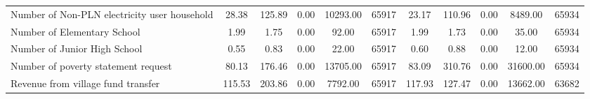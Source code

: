 \begin{tabular}{l*{2}{ccccc}}
Number of Non-PLN electricity user household&    28.38&   125.89&     0.00& 10293.00&    65917&    23.17&   110.96&     0.00&  8489.00&    65934\\
Number of Elementary School&     1.99&     1.75&     0.00&    92.00&    65917&     1.99&     1.73&     0.00&    35.00&    65934\\
Number of Junior High School&     0.55&     0.83&     0.00&    22.00&    65917&     0.60&     0.88&     0.00&    12.00&    65934\\
Number of poverty statement request&    80.13&   176.46&     0.00& 13705.00&    65917&    83.09&   310.76&     0.00& 31600.00&    65934\\
Revenue from village fund transfer&   115.53&   203.86&     0.00&  7792.00&    65917&   117.93&   127.47&     0.00& 13662.00&    63682\\
\bottomrule
\end{tabular}
